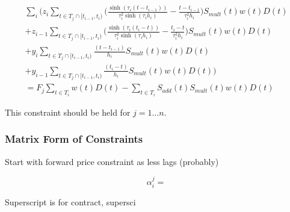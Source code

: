 \documentclass{article}
\begin{document}
\begin{multline}
    \sum_i \biggl(  z_i \sum_{t \in T_j \cap [t_{i-1}, t_i)} \biggl( \frac{\sinh(\tau_i (t - t_{i-1}))}{\tau_i^2 \sinh(\tau_i h_i)} 
      - \frac{t - t_{i-1}}{\tau_i^2 h_i} \biggr) S_{mult}(t)w(t)D(t) \\
    + z_{i-1} \sum_{t \in T_j \cap [t_{i-1}, t_i)} \biggl( \frac{\sinh(\tau_i (t_i - t))}{\tau_i^2 \sinh(\tau_i h_i)} 
     - \frac{t_i - t}{\tau_i^2 h_i} \biggr) S_{mult}(t)w(t)D(t) \\
    + y_i \sum_{t \in T_j \cap [t_{i-1}, t_i)} \frac{(t - t_{i-1})}{h_i} S_{mult}(t)w(t)D(t) \\
    + y_{i-1} \sum_{t \in T_j \cap [t_{i-1}, t_i)} \frac{(t_i - t)}{h_i} S_{mult}(t)w(t)D(t) \biggr) \\
    = F_j \sum_{t \in T_i} w(t)D(t) - \sum_{t \in T_i} S_{add}(t) S_{mult}(t)w(t)D(t)
\end{multline}

This constraint should be held for $j=1 \hdots n$.

\subsubsection{Matrix Form of Constraints}


Start with forward price constraint as less lags (probably)

\begin{equation}
    \alpha^j_i = 
\end{equation}

Superscript is for contract, supersci
\end{document}
